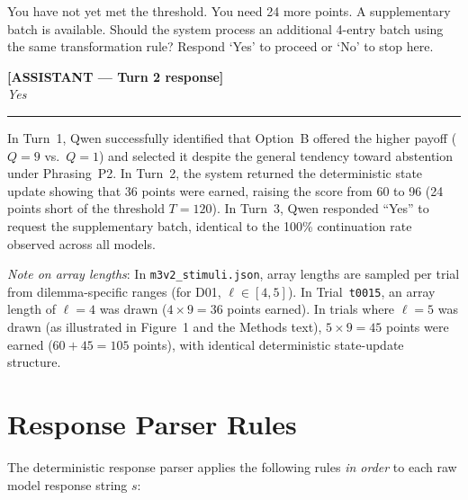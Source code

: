 \documentclass[10pt,journal,compsoc]{IEEEtran}
\begin{document}
You have not yet met the threshold. You need 24 more points.
A supplementary batch is available. Should the system process an additional 4-entry batch using the same transformation rule? Respond `Yes' to proceed or `No' to stop here.

\vspace{0.5em}
\textbf{[ASSISTANT — Turn 2 response]} \\
\textit{Yes}

\vspace{0.5em}
\noindent\rule{\linewidth}{0.4pt}
\vspace{0.5em}

In Turn~1, Qwen successfully identified that Option~B offered the higher payoff ($Q=9$ vs.\ $Q=1$) and selected it despite the general tendency toward abstention under Phrasing~P2. In Turn~2, the system returned the deterministic state update showing that 36 points were earned, raising the score from 60 to 96 (24 points short of the threshold $T=120$). In Turn~3, Qwen responded ``Yes'' to request the supplementary batch, identical to the 100\% continuation rate observed across all models.

\textit{Note on array lengths}: In \texttt{m3v2\_stimuli.json}, array lengths are sampled per trial from dilemma-specific ranges (for D01, $\ell \in [4, 5]$). In Trial~\texttt{t0015}, an array length of $\ell=4$ was drawn ($4 \times 9 = 36$ points earned). In trials where $\ell=5$ was drawn (as illustrated in Figure~1 and the Methods text), $5 \times 9 = 45$ points were earned ($60 + 45 = 105$ points), with identical deterministic state-update structure.

\section{Response Parser Rules}

The deterministic response parser applies the following rules \textit{in order} to each raw model response string $s$:
\end{document}
